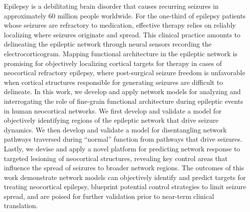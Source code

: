 
\begin{abstracts}
Epilepsy is a debilitating brain disorder that causes recurring seizures in approximately 60 million people worldwide. For the one-third of epilepsy patients whose seizures are refractory to medication, effective therapy relies on reliably localizing where seizures originate and spread. This clinical practice amounts to delineating the epileptic network through neural sensors recording the electrocorticogram. Mapping functional architecture in the epileptic network is promising for objectively localizing cortical targets for therapy in cases of neocortical refractory epilepsy, where post-surgical seizure freedom is unfavorable when cortical structures responsible for generating seizures are difficult to delineate. In this work, we develop and apply network models for analyzing and interrogating the role of fine-grain functional architecture during epileptic events in human neocortical networks. We first develop and validate a model for objectively identifying regions of the epileptic network that drive seizure dynamics. We then develop and validate a model for disentangling network pathways traversed during ``normal'' function from pathways that drive seizures. Lastly, we devise and apply a novel platform for predicting network response to targeted lesioning of neocortical structures, revealing key control areas that influence the spread of seizures to broader network regions. The outcomes of this work demonstrate network models can objectively identify and predict targets for treating neocortical epilepsy, blueprint potential control strategies to limit seizure spread, and are poised for further validation prior to near-term clinical translation.
\end{abstracts}

